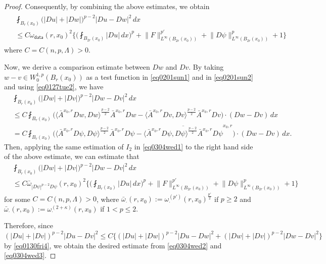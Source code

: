 \documentclass[reqno]{amsart}
\numberwithin{equation}{section}
\theoremstyle{plain}
\theoremstyle{definition}
\theoremstyle{remark}
\providecommand{\biggset}[1]{\biggl\{#1\biggr\}}
\providecommand{\abs}[1]{\lvert#1\rvert}
\providecommand{\ip}[1]{\langle#1\rangle}
\providecommand{\norm}[1]{\lVert#1\rVert}
\begin{document}
\begin{proof}
Consequently, by combining the above estimates, we obtain
\begin{align} \label{eq0304wed2}
\begin{split}
&\fint_{B_r(x_0)} \big(  \abs{Du}+\abs{Dw} \big)^{p-2}\abs{Du-Dw}^2 \,dx\\
&\leq C \omega_{\mathsf{data}}(r,x_0)^2\biggset{    \bigg(\fint_{B_{2r}(x_0)} \abs{Du} \, dx\bigg)^p +  \norm{F}_{L^\infty(B_{2r}(x_0))}
^{p'}+\norm{D\psi}_{L^\infty(B_{2r}(x_0))}^p+1    }
\end{split}
\end{align}
where $C=C(n,p,\Lambda)>0$.

Now, we derive a comparison estimate between $Dw$ and $Dv$. By taking $w-v\in W^{1,p}_0(B_r(x_0))$ as a test function in \eqref{eq0201sun1} and in \eqref{eq0201sun2} and using \eqref{eq0127tue2}, we have
\begin{align*}
&\fint_{B_r(x_0)} \big(  \abs{Dw}+\abs{Dv} \big)^{p-2}\abs{Dw-Dv}^2 \,dx\\
& \le C \fint_{B_r(x_0)} \big( \ip{ \bar{A}^{x_0,r}  Dw,Dw}^{\frac{p-2}{2}} \bar{A}^{x_0,r} Dw -\ip{ \bar{A}^{x_0,r}  Dv,Dv}^{\frac{p-2}{2}} \bar{A}^{x_0,r} Dv \big) \cdot (Dw-Dv) \,dx \\
&=C\fint_{B_r(x_0)}  \bigg( \ip{ \bar{A}^{x_0,r} D\psi,D\psi}^{\frac{p-2}{2}} \bar{A}^{x_0,r} D\psi   -\overline{\ip{\bar{A}^{x_0,r}D\psi, D\psi}^{\frac{p-2}{2}} \bar{A}^{x_0,r} D\psi}^{x_0,r}\bigg) \cdot  (Dw-Dv) \,dx .
\end{align*}
Then, applying the same estimation of $I_2$ in \eqref{eq0304wed1} to the right hand side of the above estimate, we can estimate that
\begin{equation}\label{eq0304wed3}
\begin{split}
&\fint_{B_r(x_0)} \big(  \abs{Dw}+\abs{Dv} \big)^{p-2}\abs{Dw-Dv}^2 \,dx \\
&\leq  C \bar{\omega}_{|D\psi|^{p-2}D\psi}(r,x_0)^{2} \biggset{  \bigg(\fint_{B_r(x_0)} \abs{Du} \, dx \bigg)^p   +   \norm{F}_{L^\infty(B_{2r}(x_0))}
^{p'}+\norm{D\psi}_{L^\infty(B_{2r}(x_0))}^p+1     }
\end{split}
\end{equation}
for some $C=C(n,p, \Lambda)>0$, where $\bar{\omega}_{\cdot}(r,x_0):= \omega_{\cdot}^{(p')}(r,x_0)^{\frac{p'}{2}}$ if $p\ge 2$ and $\bar{\omega}_{\cdot}(r,x_0):= \omega_{\cdot}^{(2+\kappa)}(r,x_0)$ if $1<p\le 2$.

Therefore, since  $ (  \abs{Du}+\abs{Dv} )^{p-2}\abs{Du-Dv}^2  \le C \{ ( \abs{Du}+\abs{Dw} )^{p-2}\abs{Du-Dw}^2  + (  \abs{Dw}+\abs{Dv} )^{p-2}\abs{Dw-Dv}^2 \}$  by \eqref{eq0130fri4}, we obtain the desired estimate  from \eqref{eq0304wed2} and \eqref{eq0304wed3}.
\end{proof}
\end{document}
